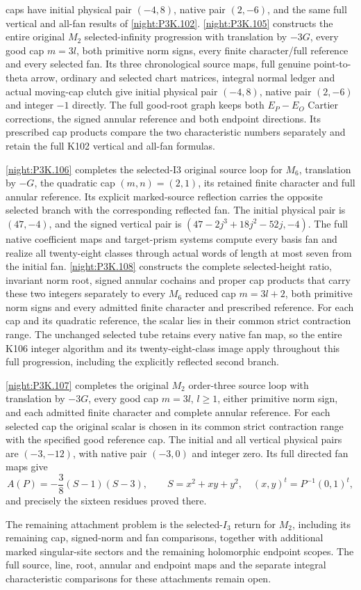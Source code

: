 \begin{theorem}
caps have initial physical pair \((-4,8)\), native pair
\((2,-6)\), and the same full vertical and all-fan results
of \cref{night:P3K.102}. \cref{night:P3K.105} constructs the entire original
\(M_2\) selected-infinity progression with translation by
\(-3G\), every good cap \(m=3l\), both primitive norm
signs, every finite character/full reference and every
selected fan. Its three chronological source maps, full
genuine point-to-theta arrow, ordinary and selected chart
matrices, integral normal ledger and actual moving-cap
clutch give initial physical pair \((-4,8)\), native
pair \((2,-6)\) and integer \(-1\) directly. The full
good-root graph keeps both \(E_P-E_O\) Cartier corrections,
the signed annular reference and both endpoint directions.
Its prescribed cap products compare the two characteristic
numbers separately and retain the full K102 vertical and
all-fan formulas.

\cref{night:P3K.106} completes the selected-I3 original source
loop for \(M_6\), translation by \(-G\), the quadratic cap
\((m,n)=(2,1)\), its retained finite character and full annular
reference. Its explicit marked-source reflection carries the
opposite selected branch with the corresponding reflected fan.
The initial physical pair is \((47,-4)\), and the signed vertical
pair is \((47-2j^3+18j^2-52j,-4)\). The full native coefficient
maps and target-prism systems compute every basis fan and realize
all twenty-eight classes through actual words of length at most
seven from the initial fan. \cref{night:P3K.108} constructs the complete
selected-height ratio, invariant norm root, signed annular cochains
and proper cap products that carry these two integers separately
to every \(M_6\) reduced cap \(m=3l+2\), both primitive norm
signs and every admitted finite character and prescribed reference.
For each cap and its quadratic reference, the scalar lies in their
common strict contraction range. The unchanged selected tube retains
every native fan map, so the entire K106 integer algorithm and its
twenty-eight-class image apply throughout this full progression,
including the explicitly reflected second branch.

\cref{night:P3K.107} completes the original \(M_2\) order-three
source loop with translation by \(-3G\), every good cap
\(m=3l\), \(l\geq1\), either primitive norm sign, and each
admitted finite character and complete annular reference.
For each selected cap the original scalar is chosen in its common
strict contraction range with the specified good reference cap.
The initial and all vertical physical pairs are \((-3,-12)\),
with native pair \((-3,0)\) and integer zero. Its full directed
fan maps give
\[
 A(P)=-\frac38(S-1)(S-3),\qquad
 S=x^2+xy+y^2,\quad (x,y)^t=P^{-1}(0,1)^t,
\]
and precisely the sixteen residues proved there.

The remaining attachment problem is the selected-\(I_3\) return
for \(M_2\), including its remaining cap, signed-norm and fan
comparisons, together with additional marked singular-site sectors
and the remaining holomorphic endpoint scopes. The full source,
line, root, annular and endpoint maps and the separate integral
characteristic comparisons for these attachments remain open.
\end{theorem}
